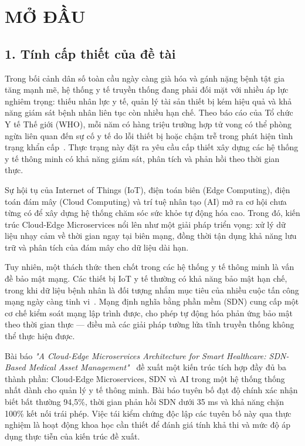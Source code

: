 {}
\chapter*{MỞ ĐẦU}

\section*{1. Tính cấp thiết của đề tài}

Trong bối cảnh dân số toàn cầu ngày càng già hóa và gánh nặng bệnh tật gia tăng mạnh mẽ, hệ thống y tế truyền thống đang phải đối mặt với nhiều áp lực nghiêm trọng: thiếu nhân lực y tế, quản lý tài sản thiết bị kém hiệu quả và khả năng giám sát bệnh nhân liên tục còn nhiều hạn chế. Theo báo cáo của Tổ chức Y tế Thế giới (WHO), mỗi năm có hàng triệu trường hợp tử vong có thể phòng ngừa liên quan đến sự cố y tế do lỗi thiết bị hoặc chậm trễ trong phát hiện tình trạng khẩn cấp~\cite{who2021}. Thực trạng này đặt ra yêu cầu cấp thiết xây dựng các hệ thống y tế thông minh có khả năng giám sát, phân tích và phản hồi theo thời gian thực.

Sự hội tụ của Internet of Things (IoT), điện toán biên (Edge Computing), điện toán đám mây (Cloud Computing) và trí tuệ nhân tạo (AI) mở ra cơ hội chưa từng có để xây dựng hệ thống chăm sóc sức khỏe tự động hóa cao. Trong đó, kiến trúc Cloud-Edge Microservices nổi lên như một giải pháp triển vọng: xử lý dữ liệu nhạy cảm về thời gian ngay tại biên mạng, đồng thời tận dụng khả năng lưu trữ và phân tích của đám mây cho dữ liệu dài hạn.

Tuy nhiên, một thách thức then chốt trong các hệ thống y tế thông minh là vấn đề bảo mật mạng. Các thiết bị IoT y tế thường có khả năng bảo mật hạn chế, trong khi dữ liệu bệnh nhân là đối tượng nhắm mục tiêu của nhiều cuộc tấn công mạng ngày càng tinh vi~\cite{kruse2017cybersecurity}. Mạng định nghĩa bằng phần mềm (SDN) cung cấp một cơ chế kiểm soát mạng lập trình được, cho phép tự động hóa phản ứng bảo mật theo thời gian thực — điều mà các giải pháp tường lửa tĩnh truyền thống không thể thực hiện được.

Bài báo \textit{"A Cloud-Edge Microservices Architecture for Smart Healthcare: SDN-Based Medical Asset Management"}~\cite{paper_main} đề xuất một kiến trúc tích hợp đầy đủ ba thành phần: Cloud-Edge Microservices, SDN và AI trong một hệ thống thống nhất dành cho quản lý y tế thông minh. Bài báo tuyên bố đạt độ chính xác nhận biết bất thường 94,5\%, thời gian phản hồi SDN dưới 35 ms và khả năng chặn 100\% kết nối trái phép. Việc tái kiểm chứng độc lập các tuyên bố này qua thực nghiệm là hoạt động khoa học cần thiết để đánh giá tính khả thi và mức độ áp dụng thực tiễn của kiến trúc đề xuất.

